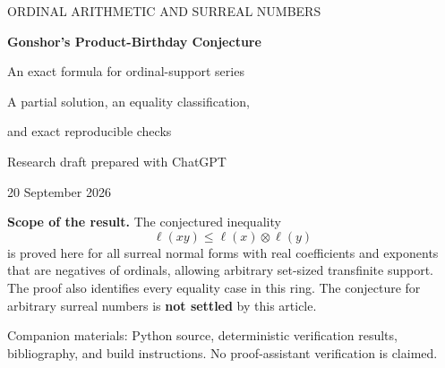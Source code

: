 \documentclass[11pt,letterpaper]{article}
\theoremstyle{definition}
\theoremstyle{remark}
\newcommand{\A}{\mathscr{A}}
\newcommand{\bd}{\ell}
\newcommand{\np}{\mathbin{\otimes}}
\begin{document}
\begin{titlepage}
\thispagestyle{empty}
\vspace*{0.25cm}
{\color{accent}\large ORDINAL ARITHMETIC AND SURREAL NUMBERS\par}
\vspace{0.4cm}
{\color{ink}\huge\bfseries Gonshor's Product-Birthday Conjecture\par}
\vspace{0.45cm}
{\color{ink}\LARGE An exact formula for ordinal-support series\par}
\vspace{0.45cm}
{\large A partial solution, an equality classification,\par
and exact reproducible checks\par}
\vspace{0.45cm}
{Research draft prepared with ChatGPT\par
20 September 2026\par}
\vspace{0.45cm}
\begin{resultbox}
\textbf{Scope of the result.}
The conjectured inequality
\[
 \bd(xy)\leq \bd(x)\np\bd(y)
\]
is proved here for all surreal normal forms with real coefficients and
exponents that are negatives of ordinals, allowing arbitrary set-sized
transfinite support. The proof also identifies every equality case in this
ring. The conjecture for arbitrary surreal numbers is \textbf{not settled}
by this article.
\end{resultbox}
\vspace{0.15cm}
\begin{abstract}
Gonshor's product-birthday conjecture asks whether the canonical sign length
of a surreal product is bounded by the natural product of the sign lengths
of its factors. We investigate the ring
\(\A=\{\sum_{\alpha\in S}c_\alpha\omega^{-\alpha}\}\), where
\(S\) is any set of ordinals and the nonzero coefficients are real.
Specializing the classical reduced-sign-expansion theorem gives an exact
birthday formula determined by the supremum of the support, the last
coefficient when one exists, and one endpoint correction. This yields a
sharp support bound for products and shows that multiplication does not
increase the leading Cantor degree of the birthday inside \(\A\).
Consequently the conjecture holds throughout \(\A\), strictly except for
zero factors, factors equal to \(\pm1\), and pairs of ordinary integers.
We also obtain a four-coefficient formula for finite-support product
birthdays and describe natural set-sized local subrings. Exact rational
computations check the endpoint formula on 64,401 series and the product
results on 96,636 pairs. The transfinite statements are established by
written proofs, not by these finite tests. Historical priority for these
particular special-case results has not been established.
\end{abstract}
\vfill
{\small\color{ink}Companion materials: Python source, deterministic verification
results, bibliography, and build instructions. No proof-assistant
verification is claimed.}
\end{titlepage}
\end{document}
